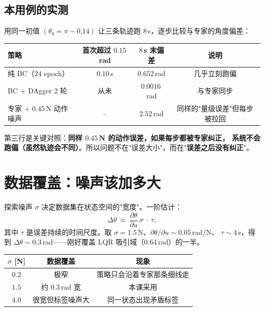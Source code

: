 \subsection{本用例的实测}

用同一初值 $(\theta_0=\pi-0.14)$ 让三条轨迹跑 $8$\,s，逐步比较与专家的角度偏差：

\begin{center}
\small
\begin{tabular}{@{}lccc@{}}
\toprule
策略 & 首次超过 $0.15$\,rad & $8$\,s 末偏差 & 说明 \\
\midrule
纯 BC（$24$ epoch） & $\mathbf{0.10}$\,s & $0.652$\,rad & 几乎立刻跑偏 \\
BC + DAgger 2 轮 & 从未 & $0.0016$\,rad & 与专家同步 \\
专家 + $0.45$\,N 动作噪声 & -- & $2.52$\,rad & 同样的"量级误差"但每步被拉回 \\
\bottomrule
\end{tabular}
\end{center}

第三行是关键对照：\textbf{同样 $0.45$\,N 的动作误差，如果每步都被专家纠正，
系统不会跑偏（虽然轨迹会不同）}。所以问题不在"误差大小"，而在"\textbf{误差之后没有纠正}"。

\section{数据覆盖：噪声该加多大}

探索噪声 $\sigma$ 决定数据集在状态空间的"宽度"。一阶估计：
\begin{equation}
  \Delta \theta\ \approx\ \frac{\partial \theta}{\partial u}\,\sigma\ \cdot\ \tau,
\end{equation}
其中 $\tau$ 是误差持续的时间尺度。取 $\sigma=1.5$\,N、$\partial\theta/\partial u\sim0.05$\,rad/N、
$\tau\sim4$\,s，得到 $\Delta\theta\sim0.3$\,rad——刚好覆盖 LQR 吸引域（$0.64$\,rad）的一半。

\begin{center}
\small
\begin{tabular}{@{}ccc@{}}
\toprule
$\sigma$ [N] & 数据覆盖 & 现象 \\
\midrule
$0.2$ & 极窄 & 策略只会沿着专家那条细线走 \\
$1.5$ & 约 $0.3$\,rad 宽 & 本课采用 \\
$4.0$ & 很宽但标签噪声大 & 同一状态出现矛盾标签 \\
\bottomrule
\end{tabular}
\end{center}

